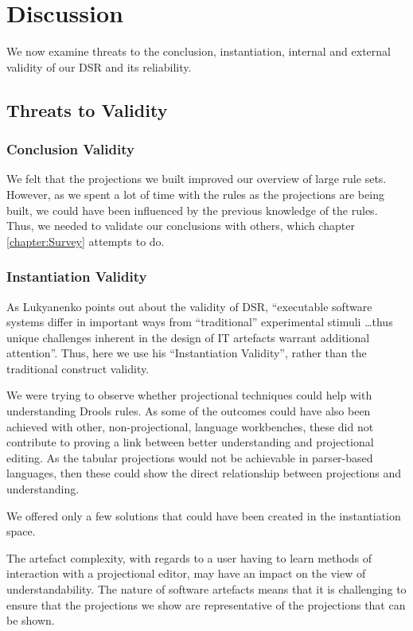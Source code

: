 \section{Discussion}
\label{section:dsr_discussion}

We now examine threats to the conclusion, instantiation, internal and external validity of our DSR and its reliability.

\subsection{Threats to Validity} 

\subsubsection{Conclusion Validity}
We felt that the projections we built improved our overview of large rule sets.
However, as we spent a lot of time with the rules as the projections are being built, we could have been influenced by the previous knowledge of the rules.
Thus, we needed to validate our conclusions with others, which chapter \ref{chapter:Survey} attempts to do.

\subsubsection{Instantiation Validity}
As Lukyanenko\cite{Lukyanenko_2014} points out about the validity of DSR, ``executable software systems differ in important ways from ``traditional'' experimental stimuli \dots thus unique challenges inherent in the design of IT artefacts warrant additional attention''.
Thus, here we use his ``Instantiation Validity'', rather than the traditional construct validity.

We were trying to observe whether projectional techniques could help with understanding Drools rules. 
As some of the outcomes could have also been achieved with other, non-projectional, language workbenches, these did not contribute to proving a link between better understanding and projectional editing.
As the tabular projections would not be achievable in parser-based languages, then these could show the direct relationship between projections and understanding.

We offered only a few solutions that could have been created in the instantiation space.

The artefact complexity, with regards to a user having to learn methods of interaction with a projectional editor, may have an impact on the view of understandability.
The nature of software artefacts means that it is challenging to ensure that the projections we show are representative of the projections that can be shown.

